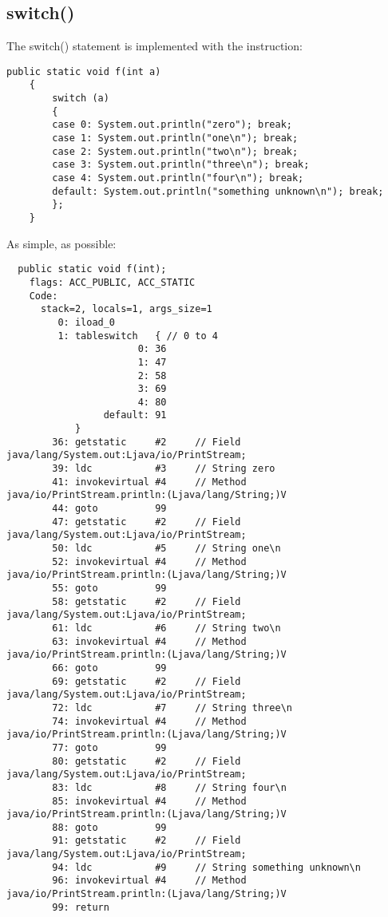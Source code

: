 \subsection{switch()}

The switch() statement is implemented with the  instruction:


\begin{lstlisting}[style=customjava]
	public static void f(int a)
	{
		switch (a)
		{
		case 0: System.out.println("zero"); break;
		case 1: System.out.println("one\n"); break;
		case 2: System.out.println("two\n"); break;
		case 3: System.out.println("three\n"); break;
		case 4: System.out.println("four\n"); break;
		default: System.out.println("something unknown\n"); break;
		};
	}
\end{lstlisting}

As simple, as possible:

\begin{lstlisting}
  public static void f(int);
    flags: ACC_PUBLIC, ACC_STATIC
    Code:
      stack=2, locals=1, args_size=1
         0: iload_0       
         1: tableswitch   { // 0 to 4
                       0: 36
                       1: 47
                       2: 58
                       3: 69
                       4: 80
                 default: 91
            }
        36: getstatic     #2     // Field java/lang/System.out:Ljava/io/PrintStream;
        39: ldc           #3     // String zero
        41: invokevirtual #4     // Method java/io/PrintStream.println:(Ljava/lang/String;)V
        44: goto          99
        47: getstatic     #2     // Field java/lang/System.out:Ljava/io/PrintStream;
        50: ldc           #5     // String one\n
        52: invokevirtual #4     // Method java/io/PrintStream.println:(Ljava/lang/String;)V
        55: goto          99
        58: getstatic     #2     // Field java/lang/System.out:Ljava/io/PrintStream;
        61: ldc           #6     // String two\n
        63: invokevirtual #4     // Method java/io/PrintStream.println:(Ljava/lang/String;)V
        66: goto          99
        69: getstatic     #2     // Field java/lang/System.out:Ljava/io/PrintStream;
        72: ldc           #7     // String three\n
        74: invokevirtual #4     // Method java/io/PrintStream.println:(Ljava/lang/String;)V
        77: goto          99
        80: getstatic     #2     // Field java/lang/System.out:Ljava/io/PrintStream;
        83: ldc           #8     // String four\n
        85: invokevirtual #4     // Method java/io/PrintStream.println:(Ljava/lang/String;)V
        88: goto          99
        91: getstatic     #2     // Field java/lang/System.out:Ljava/io/PrintStream;
        94: ldc           #9     // String something unknown\n
        96: invokevirtual #4     // Method java/io/PrintStream.println:(Ljava/lang/String;)V
        99: return        
\end{lstlisting}
